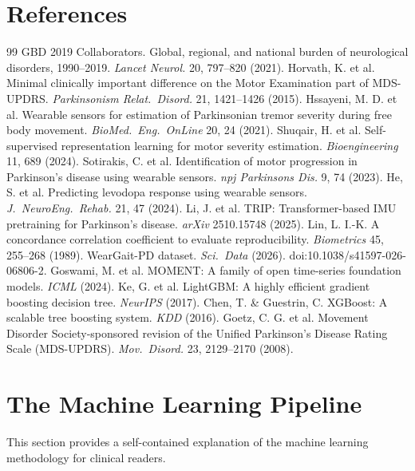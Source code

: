\documentclass[11pt]{article}
\begin{document}
\section*{References}
\begin{thebibliography}{99}
 GBD 2019 Collaborators. Global, regional, and national burden of neurological disorders, 1990--2019. \emph{Lancet Neurol.} 20, 797--820 (2021).
 Horvath, K. et al. Minimal clinically important difference on the Motor Examination part of MDS-UPDRS. \emph{Parkinsonism Relat.\ Disord.} 21, 1421--1426 (2015).
 Hssayeni, M. D. et al. Wearable sensors for estimation of Parkinsonian tremor severity during free body movement. \emph{BioMed.\ Eng.\ OnLine} 20, 24 (2021).
 Shuqair, H. et al. Self-supervised representation learning for motor severity estimation. \emph{Bioengineering} 11, 689 (2024).
 Sotirakis, C. et al. Identification of motor progression in Parkinson's disease using wearable sensors. \emph{npj Parkinsons Dis.} 9, 74 (2023).
 He, S. et al. Predicting levodopa response using wearable sensors. \emph{J.\ NeuroEng.\ Rehab.} 21, 47 (2024).
 Li, J. et al. TRIP: Transformer-based IMU pretraining for Parkinson's disease. \emph{arXiv} 2510.15748 (2025).
 Lin, L. I.-K. A concordance correlation coefficient to evaluate reproducibility. \emph{Biometrics} 45, 255--268 (1989).
 WearGait-PD dataset. \emph{Sci.\ Data} (2026). doi:10.1038/s41597-026-06806-2.
 Goswami, M. et al. MOMENT: A family of open time-series foundation models. \emph{ICML} (2024).
 Ke, G. et al. LightGBM: A highly efficient gradient boosting decision tree. \emph{NeurIPS} (2017).
 Chen, T. \& Guestrin, C. XGBoost: A scalable tree boosting system. \emph{KDD} (2016).
 Goetz, C. G. et al. Movement Disorder Society-sponsored revision of the Unified Parkinson's Disease Rating Scale (MDS-UPDRS). \emph{Mov.\ Disord.} 23, 2129--2170 (2008).
\end{thebibliography}

\appendix

\section{The Machine Learning Pipeline}

This section provides a self-contained explanation of the machine learning methodology for clinical readers.
\end{document}
